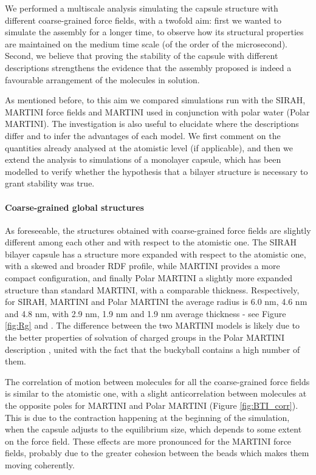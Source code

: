 We performed a multiscale analysis simulating the capsule structure with different coarse-grained force fields, with a twofold aim: first we wanted to simulate the assembly for a longer time, to observe how its structural properties are maintained on the medium time scale (of the order of the microsecond). Second, we believe that proving the stability of the capsule with different descriptions strengthens the evidence that the assembly proposed is indeed a favourable arrangement of the molecules in solution.

As mentioned before, to this aim we compared simulations run with the SIRAH, MARTINI force fields and MARTINI used in conjunction with polar water (Polar MARTINI). The investigation is also useful to elucidate where the descriptions differ and to infer the advantages of each model.
%
We first comment on the quantities already analysed at the atomistic level (if applicable), and then we extend the analysis to simulations of a monolayer capsule, which has been modelled to verify whether the hypothesis that a bilayer structure is necessary to grant stability was true.

\paragraph{Coarse-grained global structures}
As foreseeable, the structures obtained with coarse-grained force fields are slightly different among each other and with respect to the atomistic one.
%
The SIRAH bilayer capsule has a structure more expanded with respect to the atomistic one, with a skewed and broader RDF profile, while MARTINI provides a more compact configuration, and finally Polar MARTINI a slightly more expanded structure than standard MARTINI, with a comparable thickness. Respectively, for SIRAH, MARTINI and Polar MARTINI the average radius is 6.0 nm, 4.6 nm and 4.8 nm, with 2.9 nm, 1.9 nm and 1.9 nm average thickness - see Figure \ref{fig:Rg} and .
%
The difference between the two MARTINI models is likely due to the better properties of solvation of charged groups in the Polar MARTINI description \citep{Yesylevskyy2010}, united with the fact that the buckyball contains a high number of them.

The correlation of motion between molecules for all the coarse-grained force fields is similar to the atomistic one, with a slight anticorrelation between molecules at the opposite poles for MARTINI and Polar MARTINI (Figure \ref{fig:BTI_corr}). This is due to the contraction happening at the beginning of the simulation, when the capsule adjusts to the equilibrium size, which depends to some extent on the force field.
%
These effects are more pronounced for the MARTINI force fields, probably due to the greater cohesion between the beads which makes them moving coherently.

